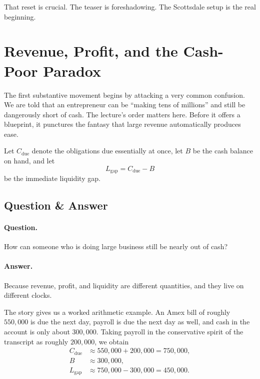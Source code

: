 That reset is crucial. The teaser is foreshadowing. The Scottsdale setup is the real beginning.

\section{Revenue, Profit, and the Cash-Poor Paradox}

The first substantive movement begins by attacking a very common confusion. We are told that an entrepreneur can be ``making tens of millions'' and still be dangerously short of cash. The lecture's order matters here. Before it offers a blueprint, it punctures the fantasy that large revenue automatically produces ease.

\begin{definition}
Let \(C_{\text{due}}\) denote the obligations due essentially at once, let \(B\) be the cash balance on hand, and let
\begin{equation}
L_{\text{gap}} = C_{\text{due}} - B
\end{equation}
be the immediate liquidity gap.
\end{definition}

\subsection{Question \& Answer}

\paragraph{Question.} How can someone who is doing large business still be nearly out of cash?

\paragraph{Answer.} Because revenue, profit, and liquidity are different quantities, and they live on different clocks.

The story gives us a worked arithmetic example. An Amex bill of roughly \(550{,}000\) is due the next day, payroll is due the next day as well, and cash in the account is only about \(300{,}000\). Taking payroll in the conservative spirit of the transcript as roughly \(200{,}000\), we obtain
\begin{align}
C_{\text{due}} &\approx 550{,}000 + 200{,}000 = 750{,}000,\\
B &\approx 300{,}000,\\
L_{\text{gap}} &\approx 750{,}000 - 300{,}000 = 450{,}000.
\end{align}

